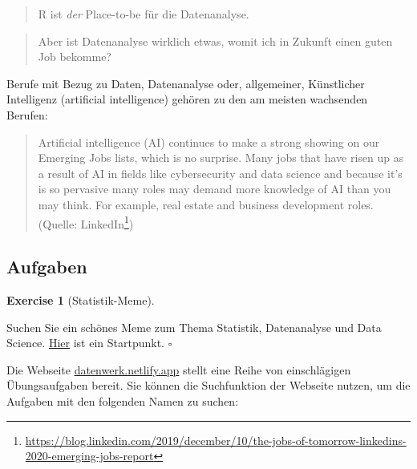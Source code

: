\documentclass[
  letterpaper,
  DIV=11,
  numbers=noendperiod]{scrartcl}
\theoremstyle{definition}
\newtheorem{exercise}{Exercise}[section]
\theoremstyle{definition}
\theoremstyle{definition}
\theoremstyle{remark}
\begin{document}
\begin{quote}
R ist \emph{der} Place-to-be für die Datenanalyse.
\end{quote}

\begin{quote}
Aber ist Datenanalyse wirklich etwas, womit ich in Zukunft einen guten
Job bekomme?
\end{quote}

Berufe mit Bezug zu Daten, Datenanalyse oder, allgemeiner, Künstlicher
Intelligenz (artificial intelligence) gehören zu den am meisten
wachsenden Berufen:

\begin{quote}
Artificial intelligence (AI) continues to make a strong showing on our
Emerging Jobs lists, which is no surprise. Many jobs that have risen up
as a result of AI in ﬁelds like cybersecurity and data science and
because it's is so pervasive many roles may demand more knowledge of AI
than you may think. For example, real estate and business development
roles. (Quelle: LinkedIn\footnote{\url{https://blog.linkedin.com/2019/december/10/the-jobs-of-tomorrow-linkedins-2020-emerging-jobs-report}})
\end{quote}

\subsection{Aufgaben}\label{aufgaben}

\begin{exercise}[Statistik-Meme]\protect\hypertarget{exr-meme}{}\label{exr-meme}

Suchen Sie ein schönes Meme zum Thema Statistik, Datenanalyse und Data
Science.
\href{https://data-se.netlify.app/2021/02/23/data-science-memes/}{Hier}
ist ein Startpunkt. \(\square\)

\end{exercise}

Die Webseite \href{https://datenwerk.netlify.app}{datenwerk.netlify.app}
stellt eine Reihe von einschlägigen Übungsaufgaben bereit. Sie können
die Suchfunktion der Webseite nutzen, um die Aufgaben mit den folgenden
Namen zu suchen:
\end{document}
